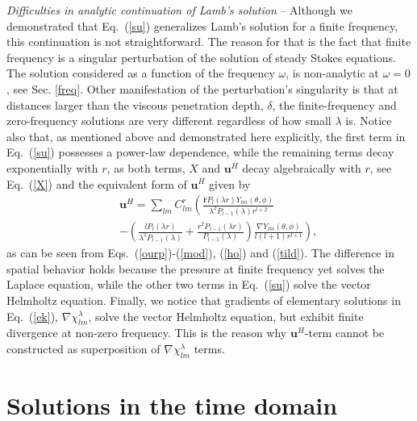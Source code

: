 \documentclass[aps,prx,twocolumn,amsmath,amssymb,amsfonts]{revtex4-2}
\begin{document}
\textit{Difficulties in analytic continuation of Lamb's solution} -- Although we demonstrated that Eq.~(\ref{su}) generalizes Lamb's solution for a finite frequency, this continuation is not straightforward. The reason for that is the fact that finite frequency is a singular perturbation of the solution of steady Stokes equations. The solution considered as a function of the frequency $\omega$, is non-analytic at $\omega\!=\!0$, see Sec. \ref{freq}. Other manifestation of the perturbation's singularity is that at distances larger than the viscous penetration depth, $\delta$, the finite-frequency and zero-frequency solutions are very different regardless of how small $\lambda$ is. Notice also that, as mentioned above and demonstrated here explicitly, the first term in Eq.~(\ref{su}) possesses a power-law dependence, while the remaining terms decay exponentially with $r$, as both terms, $X$ and $\bm u^H$ decay algebraically with $r$, see Eq.~(\ref{X}) and the equivalent form of $\bm u^H$ given by
\begin{eqnarray}&&
\bm u^H\!=\!\sum_{l m} C^{r}_{lm}  \left(\frac{\bm {\hat r}  P_{l}\left(\lambda r\right)Y_{lm}(\theta, \phi)}{\lambda^2 P_{l-1}(\lambda) r^{l+2}}
\right.\label{uH}\\&&\left.
-\!\left(\frac{lP_{l}\left(\lambda r\right)}{\lambda^2 P_{l-1}(\lambda)}
\!+\!\frac{r^2P_{l-1}\left(\lambda r\right)}{P_{l-1}(\lambda)}\right)\frac{ \nabla Y_{lm}(\theta, \phi)}{l(l+1)r^{l+1}}\right),\nonumber
\end{eqnarray}
as can be seen from Eqs.~(\ref{ourp})-(\ref{mod}),  (\ref{ho}) and (\ref{tild}). The difference in spatial behavior holds because the pressure at finite frequency yet solves the Laplace equation, while the other two terms in Eq.~(\ref{su}) solve the vector Helmholtz equation.
Finally, we notice that gradients of elementary solutions in Eq.~(\ref{ek}), $\nabla \chi^{\lambda}_{lm}$, solve the vector Helmholtz equation, but exhibit  finite divergence at non-zero frequency. This is the reason why $\bm u^H$-term cannot be constructed as superposition of $\nabla \chi^{\lambda}_{lm}$ terms.



\section{Solutions in the time domain} \label{time}
\end{document}
